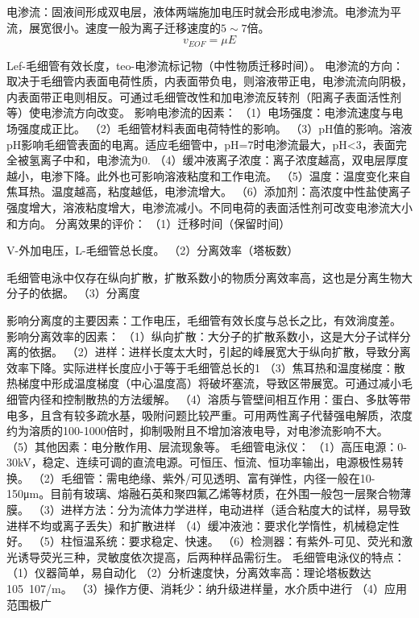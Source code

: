 电渗流：固液间形成双电层，液体两端施加电压时就会形成电渗流。电渗流为平流，展宽很小。速度一般为离子迁移速度的$5\sim 7$倍。
\begin{equation*}
	v_{EOF}=\mu E
\end{equation*}

Lef-毛细管有效长度，teo-电渗流标记物（中性物质迁移时间）。
电渗流的方向：取决于毛细管内表面电荷性质，内表面带负电，则溶液带正电，电渗流流向阴极，内表面带正电则相反。可通过毛细管改性和加电渗流反转剂（阳离子表面活性剂等）使电渗流方向改变。
影响电渗流的因素：
（1）电场强度：电渗流速度与电场强度成正比。
（2）毛细管材料表面电荷特性的影响。
（3）pH值的影响。溶液pH影响毛细管表面的电离。适应毛细管中，pH=7时电渗流最大，pH<3，表面完全被氢离子中和，电渗流为0.
（4）缓冲液离子浓度：离子浓度越高，双电层厚度越小，电渗下降。此外也可影响溶液粘度和工作电流。
（5）温度：温度变化来自焦耳热。温度越高，粘度越低，电渗流增大。
（6）添加剂：高浓度中性盐使离子强度增大，溶液粘度增大，电渗流减小。不同电荷的表面活性剂可改变电渗流大小和方向。
分离效果的评价：
（1）迁移时间（保留时间）

V-外加电压，L-毛细管总长度。
（2）分离效率（塔板数）

毛细管电泳中仅存在纵向扩散，扩散系数小的物质分离效率高，这也是分离生物大分子的依据。
（3）分离度

影响分离度的主要因素：工作电压，毛细管有效长度与总长之比，有效淌度差。
影响分离效率的因素：
（1）纵向扩散：大分子的扩散系数小，这是大分子试样分离的依据。
（2）进样：进样长度太大时，引起的峰展宽大于纵向扩散，导致分离效率下降。实际进样长度应小于等于毛细管总长的1%
（3）焦耳热和温度梯度：散热梯度中形成温度梯度（中心温度高）将破坏塞流，导致区带展宽。可通过减小毛细管内径和控制散热的方法缓解。
（4）溶质与管壁间相互作用：蛋白、多肽等带电多，且含有较多疏水基，吸附问题比较严重。可用两性离子代替强电解质，浓度约为溶质的100-1000倍时，抑制吸附且不增加溶液电导，对电渗流影响不大。
（5）其他因素：电分散作用、层流现象等。
毛细管电泳仪：
（1）高压电源：0-30kV，稳定、连续可调的直流电源。可恒压、恒流、恒功率输出，电源极性易转换。
（2）毛细管：需电绝缘、紫外/可见透明、富有弹性，内径一般在10-150μm。目前有玻璃、熔融石英和聚四氟乙烯等材质，在外围一般包一层聚合物薄膜。
（3）进样方法：分为流体力学进样，电动进样（适合粘度大的试样，易导致进样不均或离子丢失）和扩散进样
（4）缓冲液池：要求化学惰性，机械稳定性好。
（5）柱恒温系统：要求稳定、快速。
（6）检测器：有紫外-可见、荧光和激光诱导荧光三种，灵敏度依次提高，后两种样品需衍生。
毛细管电泳仪的特点：
（1）仪器简单，易自动化
（2）分析速度快，分离效率高：理论塔板数达105~107/m。
（3）操作方便、消耗少：纳升级进样量，水介质中进行
（4）应用范围极广
